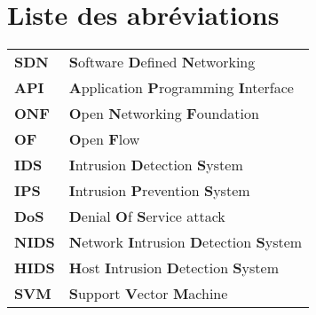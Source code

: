
\chapter{Liste des abréviations} 
\label{Abbreviation}

\begin{tabular}{ m{2cm} m{8cm} }
\textbf{SDN} & \textbf{S}oftware \textbf{D}efined \textbf{N}etworking\\

\textbf{API} & \textbf{A}pplication \textbf{P}rogramming \textbf{I}nterface\\

\textbf{ONF} & \textbf{O}pen \textbf{N}etworking \textbf{F}oundation\\

\textbf{OF} & \textbf{O}pen \textbf{F}low\\

\textbf{IDS} & \textbf{I}ntrusion \textbf{D}etection \textbf{S}ystem\\

\textbf{IPS} & \textbf{I}ntrusion \textbf{P}revention \textbf{S}ystem\\

\textbf{DoS} & \textbf{D}enial \textbf{O}f \textbf{S}ervice attack \\

\textbf{NIDS} & \textbf{N}etwork \textbf{I}ntrusion \textbf{D}etection \textbf{S}ystem\\

\textbf{HIDS} & \textbf{H}ost \textbf{I}ntrusion \textbf{D}etection \textbf{S}ystem\\

\textbf{SVM} & \textbf{S}upport \textbf{V}ector \textbf{M}achine \\
\end{tabular}